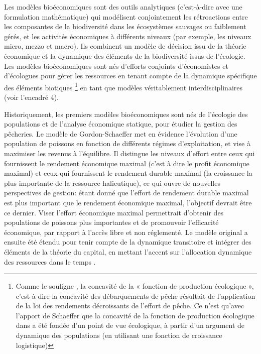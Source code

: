 Les modèles bioéconomiques sont des outils analytiques (c'est-à-dire avec une formulation mathématique) qui modélisent conjointement les rétroactions entre les composantes de la biodiversité dans les écosystèmes sauvages ou faiblement gérés,  et les activités économiques à différents niveaux (par exemple, les niveaux micro, mezzo et macro). Ils combinent un modèle de décision issu de la théorie économique et la dynamique des éléments de la biodiversité issus de l'écologie. Les modèles bioéconomiques \citep{Gordon1954, smith_models_1969, clark_profit_1973} sont nés d'efforts conjoints d'économistes et d'écologues pour gérer les ressources en tenant compte de la dynamique spécifique des éléments biotiques \citep{Parent_Mouysset_Missemer_Levrel_2024}\footnote{Comme le souligne \citep{Parent_Mouysset_Missemer_Levrel_2024}, la concavité de la « fonction de production écologique », c'est-à-dire la concavité des débarquements de pêche résultait de l'application de la loi des rendements décroissants de l'effort de pêche.  Ce n'est qu'avec l'apport de Schaeffer que la concavité de la fonction de production écologique dans \cite{Gordon1954} a été fondée d'un point de vue écologique, à partir d'un argument de dynamique des populations (en utilisant une fonction de croissance logistique)} en tant que modèles véritablement interdisciplinaires (voir l'encadré 4). 


Historiquement, les premiers modèles bioéconomiques sont nés de l'écologie des populations et de l'analyse économique statique, pour étudier la gestion des pêcheries. Le modèle de Gordon-Schaeffer \citep{Gordon1954, Schaefer1954} met en évidence l'évolution d'une population de poissons en fonction de différents régimes d'exploitation, et vise à maximiser les revenus à l'équilibre. Il distingue les niveaux d'effort entre ceux qui fournissent le rendement économique maximal (c'est à dire le profit économique maximal) et ceux qui fournissent le rendement durable maximal (la croissance la plus importante de la ressource halieutique), ce qui ouvre de nouvelles perspectives de gestion: étant donné que l'effort de rendement durable maximal est plus important que le rendement économique maximal, l'objectif  devrait être ce dernier. Viser l'effort économique maximal permettrait d'obtenir des populations de poissons plus importantes et de promouvoir l'efficacité économique, par rapport à l'accès libre et non réglementé. Le modèle original a ensuite été étendu pour tenir compte de la dynamique transitoire et intégrer des éléments de la théorie du capital, en mettant l'accent sur l'allocation dynamique des ressources dans le temps \citep{smith_models_1969, clark_profit_1973}. 



